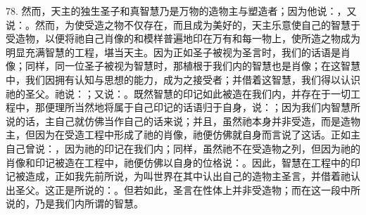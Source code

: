 78. 然而，天主的独生圣子和真智慧乃是万物的造物主与塑造者；因为他说：，又说：。然而，为使受造之物不仅存在，而且成为美好的，天主乐意使自己的智慧于受造物，以便将祂自己肖像的和模样普遍地印在万有和每一物上，使所造之物成为明显充满智慧的工程，堪当天主。因为正如圣子被视为圣言时，我们的话语是肖像；同样，同一位圣子被视为智慧时，那植根于我们内的智慧也是肖像；在这智慧中，我们因拥有认知与思想的能力，成为之接受者；并借着这智慧，我们得以认识祂的圣父。祂说：；又说：。既然智慧的印记如此被造在我们内，并存在于一切工程中，那便理所当然地将属于自己印记的话语归于自身，说：；因为我们内智慧所说的话，主自己就仿佛当作自己的话来说；并且，虽然祂本身并非受造，而是造物主，但因为在受造工程中形成了祂的肖像，祂便仿佛就自身而言说了这话。正如主自己曾说：，因为祂的印记在我们内；同样，虽然祂不在受造物之列，但因为祂的肖像和印记被造在工程中，祂便仿佛以自身的位格说：。因此，智慧在工程中的印记被造成，正如我先前所说，为叫世界在其中认出自己的造物主圣言，并借着祂认出圣父。这正是所说的：。但若如此，圣言在性体上并非受造物；而在这一段中所说的，乃是我们内所谓的智慧。\par


